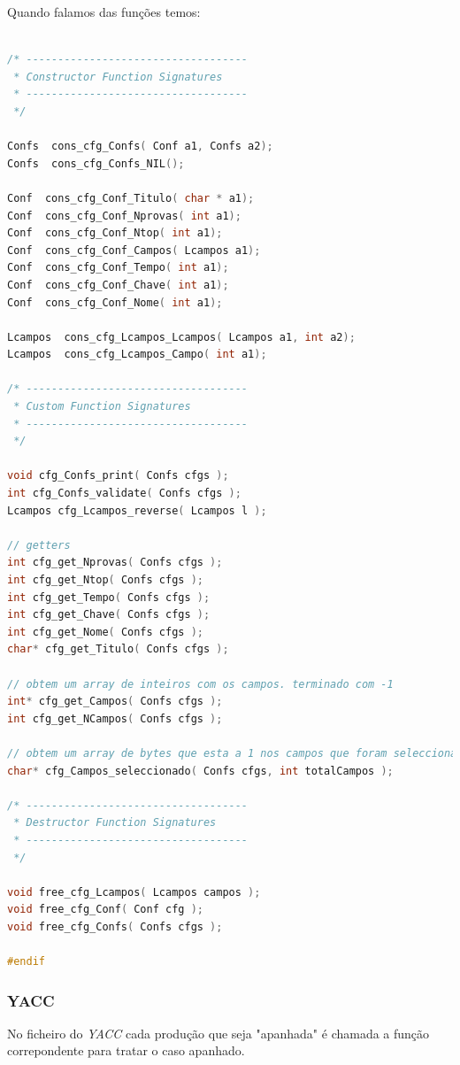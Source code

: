 \documentclass[11pt, a4paper, oneside]{article}
\begin{document}
Quando falamos das funções temos: 
\begin{lstlisting}[language=C, caption={Construtores do ficheiro de resultados.}]

/* -----------------------------------
 * Constructor Function Signatures
 * -----------------------------------
 */

Confs  cons_cfg_Confs( Conf a1, Confs a2);
Confs  cons_cfg_Confs_NIL();

Conf  cons_cfg_Conf_Titulo( char * a1);
Conf  cons_cfg_Conf_Nprovas( int a1);
Conf  cons_cfg_Conf_Ntop( int a1);
Conf  cons_cfg_Conf_Campos( Lcampos a1);
Conf  cons_cfg_Conf_Tempo( int a1);
Conf  cons_cfg_Conf_Chave( int a1);
Conf  cons_cfg_Conf_Nome( int a1);

Lcampos  cons_cfg_Lcampos_Lcampos( Lcampos a1, int a2);
Lcampos  cons_cfg_Lcampos_Campo( int a1);

/* -----------------------------------
 * Custom Function Signatures
 * -----------------------------------
 */

void cfg_Confs_print( Confs cfgs );
int cfg_Confs_validate( Confs cfgs );
Lcampos cfg_Lcampos_reverse( Lcampos l );

// getters
int cfg_get_Nprovas( Confs cfgs );
int cfg_get_Ntop( Confs cfgs );
int cfg_get_Tempo( Confs cfgs );
int cfg_get_Chave( Confs cfgs );
int cfg_get_Nome( Confs cfgs );
char* cfg_get_Titulo( Confs cfgs );

// obtem um array de inteiros com os campos. terminado com -1
int* cfg_get_Campos( Confs cfgs );
int cfg_get_NCampos( Confs cfgs );

// obtem um array de bytes que esta a 1 nos campos que foram seleccionados
char* cfg_Campos_seleccionado( Confs cfgs, int totalCampos );

/* -----------------------------------
 * Destructor Function Signatures
 * -----------------------------------
 */

void free_cfg_Lcampos( Lcampos campos );
void free_cfg_Conf( Conf cfg );
void free_cfg_Confs( Confs cfgs );

#endif
\end{lstlisting} 
\newpage

\subsubsection{YACC}
No ficheiro do \textit{YACC} cada produção que seja "apanhada" é chamada a função correpondente para tratar o caso apanhado.
\end{document}
